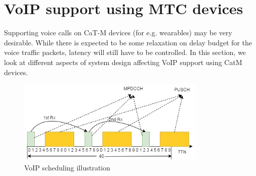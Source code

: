 \documentclass[conference,compsoc]{IEEEtran}
\begin{document}
\section{VoIP support using MTC devices}
Supporting voice calls on CaT-M devices (for e.g. wearables) may be very desirable.
While there is expected to be some relaxation on delay budget for the voice traffic packets, latency will still have to be controlled. In this section, we look at different aspects of system design affecting VoIP support using CatM devices. 

\begin{figure}[htbp]
\centerline{\includegraphics[height=40mm,width=90mm]{voip.png}}
\caption{VoIP scheduling illustration}
\label{fig_voip}
\end{figure}
\end{document}
